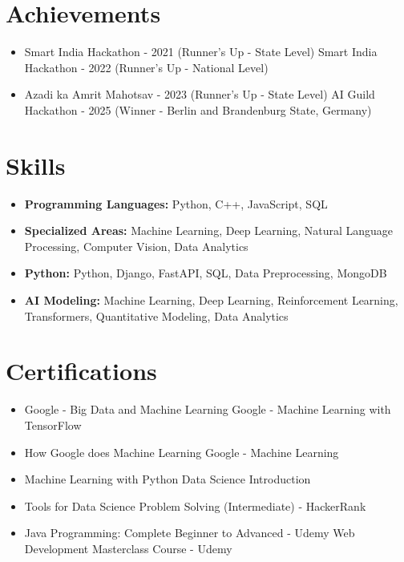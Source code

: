 \documentclass[a4paper,10pt]{article}
\begin{document}
\section*{Achievements}
\begin{itemize}
\item Smart India Hackathon - 2021 (Runner's Up - State Level) \hfill Smart India Hackathon - 2022 (Runner's Up - National Level)
\item Azadi ka Amrit Mahotsav - 2023 (Runner's Up - State Level) \hfill AI Guild Hackathon - 2025 (Winner - Berlin and Brandenburg State, Germany)
\end{itemize}

\section*{Skills}
\begin{itemize}
  \item \textbf{Programming Languages:} Python, C++, JavaScript, SQL
  \item \textbf{Specialized Areas:} Machine Learning, Deep Learning, Natural Language Processing, Computer Vision, Data Analytics
  \item \textbf{Python:} Python, Django, FastAPI, SQL, Data Preprocessing, MongoDB
  \item \textbf{AI Modeling:} Machine Learning, Deep Learning, Reinforcement Learning, Transformers, Quantitative Modeling, Data Analytics
\end{itemize}

\section*{Certifications}
\begin{itemize}
\item Google - Big Data and Machine Learning \hfill Google - Machine Learning with TensorFlow
\item How Google does Machine Learning \hfill Google - Machine Learning
\item Machine Learning with Python \hfill Data Science Introduction
\item Tools for Data Science \hfill Problem Solving (Intermediate) - HackerRank
\item Java Programming: Complete Beginner to Advanced - Udemy \hfill Web Development Masterclass Course - Udemy
\end{itemize}
\end{document}
